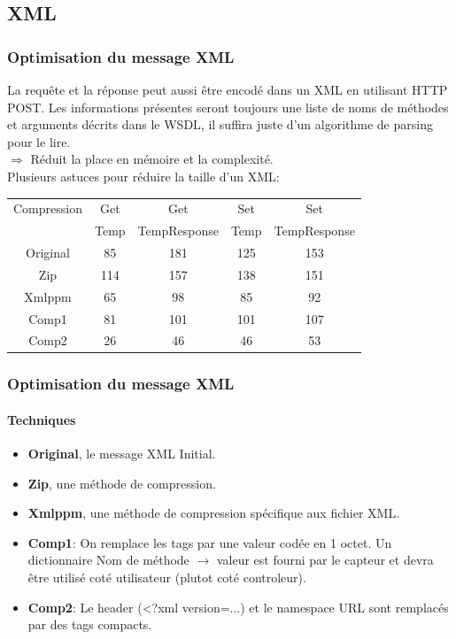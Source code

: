 \subsection{XML}
\begin{frame}
 \frametitle{Optimisation du message XML}
 La requête et la réponse peut aussi être encodé dans un XML en utilisant HTTP POST.
 Les informations présentes seront toujours une liste de noms de méthodes et arguments décrits dans le WSDL, il suffira juste d'un algorithme de parsing pour le lire.\\
 $\Rightarrow$ Réduit la place en mémoire et la complexité.\\
 \vspace{4mm}
 Plusieurs astuces pour réduire la taille d'un XML:\\
 \begin{center}
  \begin{tabular}{|c|c|c|c|c|}
   \hline
   Compression & Get & Get & Set & Set\\
   ~ & Temp & TempResponse & Temp & TempResponse\\
   \hline
   Original & 85 & 181 & 125 & 153\\
   \hline
   Zip & 114 & 157 & 138 & 151\\
   Xmlppm & 65 & 98 & 85 & 92\\
   \hline
   Comp1 & 81 & 101 & 101 & 107\\
   Comp2 & 26 & 46 & 46 & 53\\
   \hline
  \end{tabular}
 \end{center}
\end{frame}

\begin{frame}
 \frametitle{Optimisation du message XML}
 \framesubtitle{Techniques}
 \begin{itemize}
  \item \textbf{Original}, le message XML Initial.
  \item \textbf{Zip}, une méthode de compression.
  \item \textbf{Xmlppm}, une méthode de compression spécifique aux fichier XML.
  \item \textbf{Comp1}: On remplace les tags par une valeur codée en 1 octet.
  Un dictionnaire Nom de méthode $\rightarrow$ valeur est fourni par le capteur et devra être utilisé coté utilisateur (plutot coté controleur).
  \item \textbf{Comp2}: Le header (<?xml version=...) et le namespace URL sont remplacés par des tags compacts.
 \end{itemize}
\end{frame}
